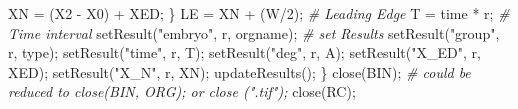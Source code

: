 \documentclass[10pt, b5paper, singlespacinge, twoside]{reedthesis} %
\newenvironment{Shaded}{}{}
\newcommand{\CommentTok}[1]{\textit{#1}}
\newcommand{\DecValTok}[1]{#1}
\newcommand{\FunctionTok}[1]{#1}
\newcommand{\NormalTok}[1]{#1}
\newcommand{\OtherTok}[1]{#1}
\newcommand{\SpecialCharTok}[1]{#1}
\newcommand{\StringTok}[1]{#1}
\theoremstyle{definition}
\theoremstyle{definition}
\theoremstyle{definition}
\theoremstyle{remark}
\begin{document}
\begin{Shaded}
\begin{Highlighting}[numbers=left,,]
\NormalTok{            XN }\OtherTok{=}\NormalTok{ (X2 }\SpecialCharTok{{-}}\NormalTok{ X0) }\SpecialCharTok{+}\NormalTok{ XED;}
\NormalTok{        \}}
\NormalTok{        LE }\OtherTok{=}\NormalTok{ XN }\SpecialCharTok{+}\NormalTok{ (W}\SpecialCharTok{/}\DecValTok{2}\NormalTok{); }\CommentTok{\# Leading Edge }
\NormalTok{        T }\OtherTok{=}\NormalTok{ time }\SpecialCharTok{*}\NormalTok{ r; }\CommentTok{\# Time interval}
        \FunctionTok{setResult}\NormalTok{(}\StringTok{"embryo"}\NormalTok{, r, orgname); }\CommentTok{\# set Results}
        \FunctionTok{setResult}\NormalTok{(}\StringTok{"group"}\NormalTok{, r, type);}
        \FunctionTok{setResult}\NormalTok{(}\StringTok{"time"}\NormalTok{, r, T);}
        \FunctionTok{setResult}\NormalTok{(}\StringTok{"deg"}\NormalTok{, r, A);}
        \FunctionTok{setResult}\NormalTok{(}\StringTok{"X\_ED"}\NormalTok{, r, XED);}
        \FunctionTok{setResult}\NormalTok{(}\StringTok{"X\_N"}\NormalTok{, r, XN);}
        \FunctionTok{updateResults}\NormalTok{();}
\NormalTok{        \}}
        \FunctionTok{close}\NormalTok{(BIN); }\CommentTok{\# could be reduced to close(BIN, ORG); or close (".tif");}
        \FunctionTok{close}\NormalTok{(RC);}
        

\end{Highlighting}
\end{Shaded}
\end{document}
